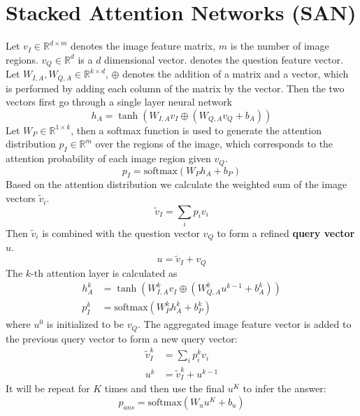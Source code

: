 \section{Stacked Attention Networks (SAN)}
Let $ v_I\in \mathbb{R}^{d \times m} $ denotes the image feature matrix, $ m $ is the number of image regions. $ v_Q \in \mathbb{R}^d $ is a $ d $ dimensional vector. denotes the question feature vector. Let $ W_{I,A}, W_{Q,A} \in \mathbb{R}^{k\times d}$, $ \oplus $ denotes the addition of a matrix and a vector, which is performed by adding each column of the matrix by the vector. Then the two vectors first go through a single layer neural network
\[h_A = \tanh (W_{I,A}v_I \oplus (W_{Q,A}v_Q+b_A))\]
Let $ W_P \in \mathbb{R}^{1\times k} $, then a softmax function is used to generate the attention distribution $ p_I \in \mathbb{R}^m $ over the regions of the image, which corresponds to the attention probability of each image region given $ v_Q $.
\[p_I = \mbox{softmax}(W_Ph_A + b_P)\]
Based on the attention distribution we calculate the weighted sum of the image vectors $ \tilde{v}_i $. 
\[\tilde{v}_I  = \sum_i p_i v_i \]
Then $ \tilde{v}_i $ is combined with the question vector $ v_Q $ to form a refined \textbf{query vector} $ u $.
\[u = \tilde v_I + v_Q \]
The $ k $-th attention layer is calculated as 
\begin{equation}
\begin{split}
	h_A^k &= \tanh(W_{I, A}^k v_I \oplus (W^k_{Q,A}u^{k-1} + b^k_A))\\
	p^k_I  &= \mbox{softmax}(W^k_P h^k_A + b^k_P)
\end{split}
\end{equation}
where $ u^0 $ is initialized to be $ v_Q $. The aggregated image feature vector is added to the previous query vector to form a new query vector:
\begin{equation}
	\begin{split}
		\tilde{v}^k_I &= \sum_i p_i^k v_i\\
  		u^k &= \tilde{v}^k_I + u^{k-1}
	\end{split}
\end{equation}
It will be repeat for $ K $ times and then use the final $ u^K $ to infer the answer:
\[ p_{ans} = \mbox{softmax}(W_u u^K + b_u)\]

